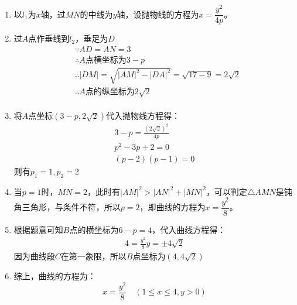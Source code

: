 \documentclass[answers]{exam}
\begin{document}
\begin{questions}
	\begin{solution}
		\begin{enumerate}[label=\protect\circled{\arabic*}]
			\item 以$l_1$为$x$轴，过$MN$的中线为$y$轴，设抛物线的方程为$x=\dfrac{y^2}{4p}$。
			\item 过$A$点作垂线到$l_2$，垂足为$D$
			      \begin{align*}
				       & \because AD = AN = 3                                                  \\
				       & \therefore A \text{点横坐标为} 3-p                                    \\
				       & \therefore  |DM| = \sqrt{|AM|^2 - |DA|^2} = \sqrt{17 - 9} = 2\sqrt{2} \\
				       & \therefore A\text{点的纵坐标为}2\sqrt{2}                              \\
			      \end{align*}
			\item 将$A$点坐标$(3-p, 2\sqrt{2})$代入抛物线方程得：
			      \begin{align*}
				      3-p = \frac{(2\sqrt{2})^2}{4p} \\
				      p^2 -3p + 2 = 0                \\
				      (p-2)(p-1) = 0
			      \end{align*}
			      则有$p_1 = 1, p_2 = 2$
			\item 当$p=1$时，$MN=2$，此时有$|AM|^2 > |AN|^2 +
				      |MN|^2$，可以判定$\triangle{AMN}$是钝角三角形，与条件不符，所以$p=2$，即曲线的方程为$x=\dfrac{y^2}{8}$。
			\item 根据题意可知$B$点的横坐标为$6-p=4$，代入曲线方程得：
			      \begin{align*}
				      4 = \frac{y^2}{8}
				      y = \pm4\sqrt{2}
			      \end{align*}
			      因为曲线段$C$在第一象限，所以$B$点坐标为$(4,4\sqrt{2})$

			\item 综上，曲线的方程为：
			      \begin{equation*}
				      x = \frac{y^2}{8} \quad (1 \leqslant x \leqslant 4, y>0)
			      \end{equation*}
		\end{enumerate}

	\end{solution}
\end{questions}
\end{document}
